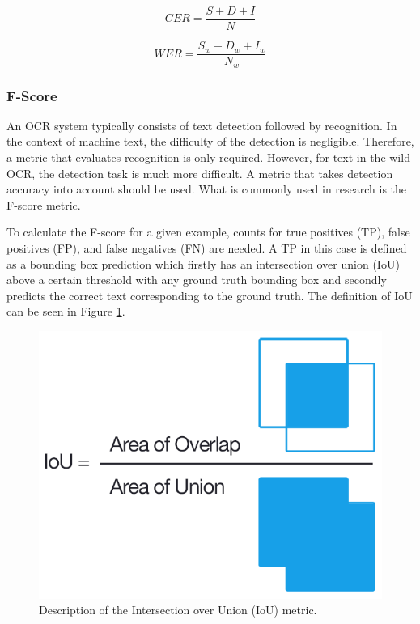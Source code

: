 \documentclass[a4paper,11pt]{article}
\begin{document}
\begin{equation}
\label{eq:CER}
CER=\frac{S+D+I}{N}
\end{equation}

\begin{equation}
\label{eq:WER}
WER=\frac{S_w+D_w+I_w}{N_w}
\end{equation}

\subsubsection{F-Score}
An OCR system typically consists of text detection followed by recognition. In the context of machine text, the difficulty of the detection is negligible. Therefore, a metric that evaluates recognition is only required. However, for text-in-the-wild OCR, the detection task is much more difficult. A metric that takes detection accuracy into account should be used. What is commonly used in research is the F-score metric.

To calculate the F-score for a given example, counts for true positives (TP), false positives (FP), and false negatives (FN) are needed. A TP in this case is defined as a bounding box prediction which firstly has an intersection over union (IoU) above a certain threshold with any ground truth bounding box and secondly predicts the correct text corresponding to the ground truth. The definition of IoU can be seen in Figure \ref{fig:iou-equation}.

\begin{figure}[H]
\centering
\includegraphics[scale=0.5]{img/iou_equation.png}
\caption{Description of the Intersection over Union (IoU) metric. \cite{iou-object-detection}}
\label{fig:iou-equation}
\end{figure}
\end{document}
